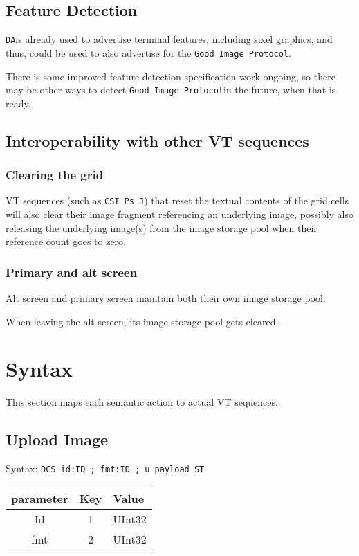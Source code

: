 \documentclass{article}
\newcommand{\code}[1]{\colorbox{light-gray}{\texttt{#1}}}
\newcommand{\DA}{\code{DA}}                          %
\newcommand{\GoodImageProtocol}{\code{Good Image Protocol}}
\begin{document}
\subsection{Feature Detection}

\DA is already used to advertise terminal features, including sixel graphics, and thus,
could be used to also advertise for the \GoodImageProtocol.

There is some improved feature detection specification work ongoing,
so there may be other ways to detect \GoodImageProtocol in the future, when that is ready.

\subsection{Interoperability with other VT sequences}

\subsubsection*{Clearing the grid}

VT sequences (such as \code{CSI Ps J}) that reset the textual contents of the grid cells will also
clear their image fragment referencing an underlying image, possibly also releasing the
underlying image(s) from the image storage pool when their reference count goes to zero.

\subsubsection*{Primary and alt screen}

Alt screen and primary screen maintain both their own image storage pool.

When leaving the alt screen, its image storage pool gets cleared.
\section{Syntax} %

This section maps each semantic action to actual VT sequences.

\subsection{Upload Image}

Syntax: \code{DCS id:ID ; fmt:ID ; u payload ST}

\begin{tabular}{ |c|c|l| }
    \hline
    parameter   & Key & Value \\
    \hline
    Id          & 1   & UInt32 \\
    fmt         & 2   & UInt32 \\
    \hline
\end{tabular}
\end{document}
